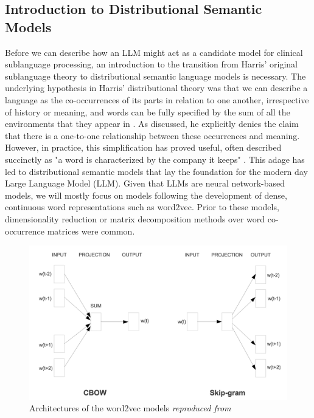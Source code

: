 \subsection{Introduction to Distributional Semantic Models}
Before we can describe how an LLM might act as a candidate model for clinical sublanguage processing, an introduction to the transition from Harris' original sublanguage theory to distributional semantic language models is necessary. The underlying hypothesis in Harris' distributional theory was that we can describe a language as the co-occurrences of its parts in relation to one another, irrespective of history or meaning, and words can be fully specified by the sum of all the environments that they appear in \citep{harrisDistributionalStructure1954a}. As discussed, he explicitly denies the claim that there is a one-to-one relationship between these occurrences and meaning. However, in practice, this simplification has proved useful, often described succinctly as "a word is characterized by the company it keeps" \citep{firth1957synopsis}. This adage has led to distributional semantic models that lay the foundation for the modern day Large Language Model (LLM). Given that LLMs are neural network-based models, we will mostly focus on models following the development of dense, continuous word representations such as word2vec. Prior to these models, dimensionality reduction \citep{sahlgren2005introduction, landauerSolutionPlatosProblem1997} or matrix decomposition \citep{baroni2010distributional} methods over word co-occurrence matrices were common. 


\begin{figure}
    \begin{center}
        \includegraphics[scale=0.25] {figures/word2vec_architectures.png}
        \caption{ Architectures of the word2vec models \emph{reproduced from \cite{mikolov2013efficient}}}
    \label{fig:word2vec}        
    \end{center}
\end{figure}

